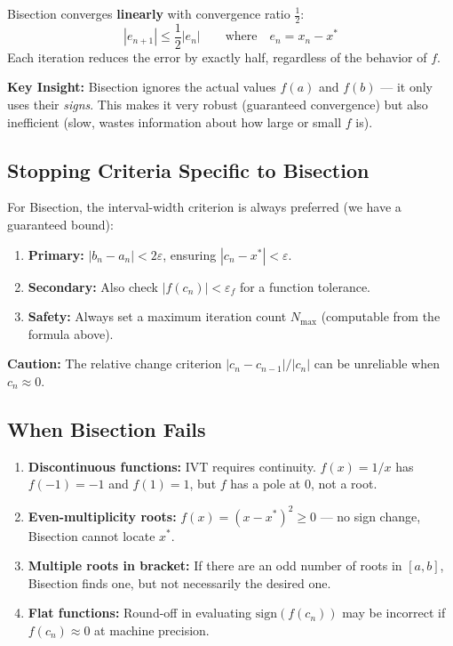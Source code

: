 \documentclass[12pt]{article}
\begin{document}
\begin{thmbox}
Bisection converges \textbf{linearly} with convergence ratio $\tfrac{1}{2}$:
\[
  |e_{n+1}| \leq \frac{1}{2}|e_n|
  \qquad\text{where}\quad e_n = x_n - x^*
\]
Each iteration reduces the error by exactly half, regardless of the behavior of $f$.
\end{thmbox}

\begin{keybox}
\textbf{Key Insight:} Bisection ignores the actual values $f(a)$ and $f(b)$ — it only uses their \textit{signs}. This makes it very robust (guaranteed convergence) but also inefficient (slow, wastes information about how large or small $f$ is).
\end{keybox}

\bigskip

\subsection*{Stopping Criteria Specific to Bisection}

For Bisection, the interval-width criterion is always preferred (we have a guaranteed bound):
\begin{enumerate}[noitemsep]
  \item \textbf{Primary:} $|b_n-a_n|<2\varepsilon$, ensuring $|c_n-x^*|<\varepsilon$.
  \item \textbf{Secondary:} Also check $|f(c_n)|<\varepsilon_f$ for a function tolerance.
  \item \textbf{Safety:} Always set a maximum iteration count $N_{\max}$ (computable from the formula above).
\end{enumerate}

\begin{keybox}
\textbf{Caution:} The relative change criterion $|c_n-c_{n-1}|/|c_n|$ can be unreliable when $c_n\approx 0$.
\end{keybox}

\subsection*{When Bisection Fails}

\begin{enumerate}[noitemsep]
  \item \textbf{Discontinuous functions:} IVT requires continuity. $f(x)=1/x$ has $f(-1)=-1$ and $f(1)=1$, but $f$ has a pole at 0, not a root.
  \item \textbf{Even-multiplicity roots:} $f(x)=(x-x^*)^2\geq 0$ — no sign change, Bisection cannot locate $x^*$.
  \item \textbf{Multiple roots in bracket:} If there are an odd number of roots in $[a,b]$, Bisection finds one, but not necessarily the desired one.
  \item \textbf{Flat functions:} Round-off in evaluating $\text{sign}(f(c_n))$ may be incorrect if $f(c_n)\approx 0$ at machine precision.
\end{enumerate}
\end{document}
